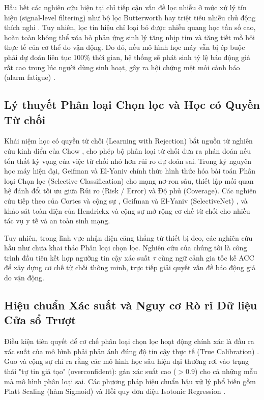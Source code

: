 \documentclass[conference]{IEEEtran}
\begin{document}
Hầu hết các nghiên cứu hiện tại chỉ tiếp cận vấn đề lọc nhiễu ở mức xử lý tín hiệu (signal-level filtering) như bộ lọc Butterworth hay triệt tiêu nhiễu chủ động thích nghi \cite{zhang2014troika}. Tuy nhiên, lọc tín hiệu chỉ loại bỏ được nhiễu quang học tần số cao, hoàn toàn không thể xóa bỏ phản ứng sinh lý tăng nhịp tim và tăng tiết mồ hôi thực tế của cơ thể do vận động. Do đó, nếu mô hình học máy vẫn bị ép buộc phải dự đoán liên tục 100\% thời gian, hệ thống sẽ phát sinh tỷ lệ báo động giả rất cao trong lúc người dùng sinh hoạt, gây ra hội chứng mệt mỏi cảnh báo (alarm fatigue) \cite{can2019stress}.

\subsection{Lý thuyết Phân loại Chọn lọc và Học có Quyền Từ chối}
Khái niệm học có quyền từ chối (Learning with Rejection) bắt nguồn từ nghiên cứu kinh điển của Chow \cite{chow1970optimum}, cho phép bộ phân loại từ chối đưa ra phán đoán nếu tổn thất kỳ vọng của việc từ chối nhỏ hơn rủi ro dự đoán sai. Trong kỷ nguyên học máy hiện đại, Geifman và El-Yaniv \cite{geifman2017selective} chính thức hình thức hóa bài toán Phân loại Chọn lọc (Selective Classification) cho mạng nơ-ron sâu, thiết lập mối quan hệ đánh đổi tối ưu giữa Rủi ro (Risk / Error) và Độ phủ (Coverage). Các nghiên cứu tiếp theo của Cortes và cộng sự \cite{cortes2016learning}, Geifman và El-Yaniv (SelectiveNet) \cite{geifman2019selectivenet}, và khảo sát toàn diện của Hendrickx và cộng sự \cite{hendrickx2021machine} mở rộng cơ chế từ chối cho nhiều tác vụ y tế và an toàn sinh mạng.

Tuy nhiên, trong lĩnh vực nhận diện căng thẳng từ thiết bị đeo, các nghiên cứu hầu như chưa khai thác Phân loại chọn lọc. Nghiên cứu của chúng tôi là công trình đầu tiên kết hợp ngưỡng tin cậy xác suất $\tau$ cùng ngữ cảnh gia tốc kế ACC để xây dựng cơ chế từ chối thông minh, trực tiếp giải quyết vấn đề báo động giả do vận động.

\subsection{Hiệu chuẩn Xác suất và Nguy cơ Rò rỉ Dữ liệu Cửa sổ Trượt}
Điều kiện tiên quyết để cơ chế phân loại chọn lọc hoạt động chính xác là đầu ra xác suất của mô hình phải phản ánh đúng độ tin cậy thực tế (True Calibration) \cite{guo2017calibration}. Guo và cộng sự \cite{guo2017calibration} chỉ ra rằng các mô hình học sâu hiện đại thường rơi vào trạng thái "tự tin giả tạo" (overconfident): gán xác suất cao ($>0.9$) cho cả những mẫu mà mô hình phân loại sai. Các phương pháp hiệu chuẩn hậu xử lý phổ biến gồm Platt Scaling (hàm Sigmoid) \cite{platt1999probabilistic} và Hồi quy đơn điệu Isotonic Regression \cite{niculescu2005predicting}.
\end{document}
